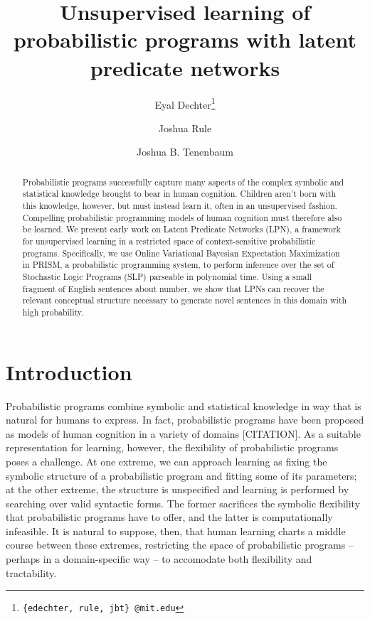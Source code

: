 \documentclass{article} %
\title{\vspace{-1.5cm} Unsupervised learning of probabilistic programs with latent predicate networks}
\author{Eyal Dechter\thanks{{\tt \{edechter, rule, jbt\} @mit.edu}}}
\author{Joshua Rule}
\author{Joshua B. Tenenbaum}
\affil{{\normalsize Department of Brain and Cognitive Sciences, MIT}}
\date{}
\begin{document}
\maketitle

\vspace{-1cm}
\begin{abstract}

  Probabilistic programs successfully capture many aspects of the
  complex symbolic and statistical knowledge brought to bear in human
  cognition. Children aren't born with this knowledge, however, but
  must instead learn it, often in an unsupervised fashion. Compelling
  probabilistic programming models of human cognition must therefore
  also be learned. We present early work on Latent Predicate Networks
  (LPN), a framework for unsupervised learning in a restricted space
  of context-sensitive probabilistic programs. Specifically, we use
  Online Variational Bayesian Expectation Maximization in
  PRISM, a probabilistic programming system, to perform inference over
  the set of Stochastic Logic Programs (SLP) parseable in polynomial
  time. Using a small fragment of English sentences about number, we
  show that LPNs can recover the relevant conceptual structure
  necessary to generate novel sentences in this domain with high
  probability.
  
\end{abstract}

\section{Introduction}


Probabilistic programs combine symbolic and statistical knowledge in way that is
natural for humans to express. In fact, probabilistic programs have
been proposed as models of human cognition in a variety of domains
[CITATION]. As a suitable representation for learning, however, the flexibility
of probabilistic programs poses a challenge. At one extreme, we can
approach learning as fixing the symbolic structure of a probabilistic
program and fitting some of its parameters; at the other extreme, the
structure is unspecified and learning is performed by searching over
valid syntactic forms. The former sacrifices the symbolic flexibility
that probabilistic programs have to offer, and the latter is
computationally infeasible. It is natural to suppose, then, that human
learning charts a middle course between these extremes, restricting
the space of probabilistic programs -- perhaps in a domain-specific
way -- to accomodate both flexibility and tractability. 
\end{document}
